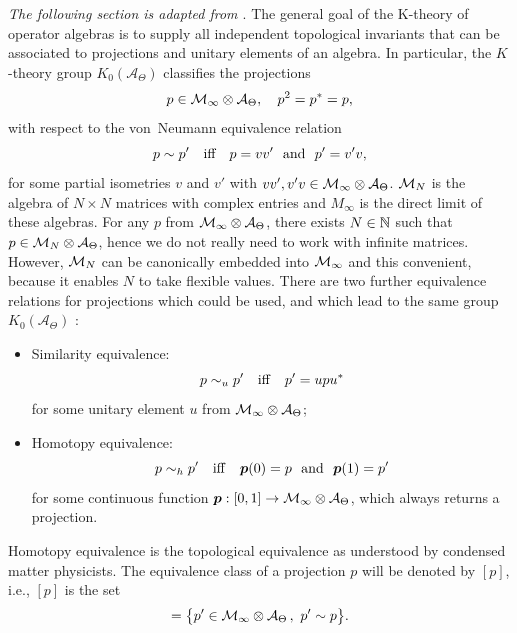 \documentclass[
    10pt,
    aps,
    prb,
    twocolumn,
    floatfix,
    superscriptaddress,
]{revtex4-2}
\begin{document}
{\it The following section is adapted from \cite{Liu2022}}. The general goal of the K-theory of operator algebras is to supply all independent topological invariants that can be associated to projections and unitary elements of an algebra.
In particular, the $K$-theory group $K_0(\mathcal{A}_\Theta)$ classifies the projections
\begin{equation}
p \in {\mathcal M}_\infty \otimes {\mathcal A}_\Theta, \quad p^2 = p^\ast=p,
\end{equation}
with respect to the von~Neumann equivalence relation
\begin{equation}\label{Eq-EquivRelation}
p \sim p' \quad \mbox{iff}  \quad p=vv' \ \  {\rm and} \ \ p' = v'v, 
\end{equation}
for some partial isometries $v$ and $v'$ with  $ vv', v'v \in {\mathcal M}_\infty \otimes {\mathcal A}_\Theta$. 
${\mathcal M}_N$ is the algebra of $N \times N$ matrices with complex entries and $M_\infty$ is the direct limit of these algebras. 
For any $p$ from ${\mathcal M}_\infty \otimes {\mathcal A}_\Theta$, there exists $N \in {\mathbb N}$ such that $p \in {\mathcal M}_N \otimes {\mathcal A}_\Theta$, hence we do not really need to work with infinite matrices. However, ${\mathcal M}_N$ can be canonically embedded into ${\mathcal M}_\infty$ and this convenient, because it enables $N$ to take flexible values.
There are two further equivalence relations for projections which could be used, and which lead to the same group $K_0(\mathcal{A}_\Theta)$ \cite[p.~18]{Park2008}:
\begin{itemize}
\item  Similarity equivalence:
\begin{equation}
p \sim_u p' \quad {\rm iff} \quad p'= u p u^\ast
\end{equation}
for some unitary element $u$ from ${\mathcal M}_\infty \otimes {\mathcal A}_\Theta$;
\item Homotopy equivalence:
\begin{equation}
p \sim_h p' \quad  {\rm iff} \quad \bm p(0)=p \ \  {\rm and} \ \  \bm p(1) = p'
\end{equation}
for some continuous function $\bm p : [0,1] \rightarrow {\mathcal M}_\infty \otimes {\mathcal A}_\Theta$, which always returns a projection. 
\end{itemize}
Homotopy equivalence is the topological equivalence as understood by condensed matter physicists. 
The equivalence class of a projection $p$ will be denoted by $[p]$, i.e., $[p]$ is the set
\begin{equation}
[p]= \big \{p' \in \Mm_\infty \otimes \Aa_\Theta \, ,  \ p' \sim p \big \}.
\end{equation}
\end{document}

